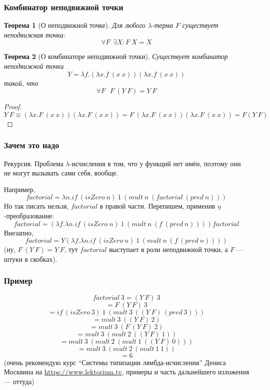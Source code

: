 \documentclass[xetex,mathserif,serif]{beamer}
\newtheorem{rustheorem}{Теорема}
\begin{document}
	\begin{frame}
		\frametitle{Комбинатор неподвижной точки}
		\begin{rustheorem}[О неподвижной точке]
			Для любого $\lambda$-терма $F$ существует неподвижная точка:
			$$\forall F\ \ \exists X : F\ X = X$$
			\vspace{-5mm}
		\end{rustheorem}
		\vspace{-5mm}
		\begin{rustheorem}[О комбинаторе неподвижной точки]
			Существует комбинатор неподвижной точки
			$$Y = \lambda f.(\lambda x.f\ (x\ x)) (\lambda x.f\ (x\ x))$$
			такой, что 
			$$\forall F\ \ \ F\ (Y\ F) = Y\ F$$
		\end{rustheorem}
		\vspace{-5mm}
		\begin{proof}
			\vspace{-7mm}
			$$Y\ F \equiv (\lambda x.F\ (x\ x))(\lambda x.F\ (x\ x)) 
				= F\ (\lambda x.F\ (x\ x))(\lambda x.F\ (x\ x)) = F(Y\ F)$$
			\vspace{-10mm}
		\end{proof}
	\end{frame}

	\begin{frame}
		\frametitle{Зачем это надо}
		Рекурсия. Проблема $\lambda$-исчисления в том, что у функций нет имён, поэтому они не могут 
		вызывать сами себя, вообще.
		
		Например,
		$$factorial = \lambda n. if\ (isZero\ n)\ 1\ (mult\ n\ (factorial\ (pred\ n)))$$
		Но так писать нельзя, $factorial$ в правой части. Перепишем, применив $\eta$-преобразование:
		$$factorial = (\lambda f.\lambda n.if\ (isZero\ n)\ 1\ (mult\ n\ (f\ (pred\ n)))) factorial$$
		Внезапно, 
		$$factorial = Y (\lambda f.\lambda n.if\ (isZero\ n)\ 1\ (mult\ n\ (f\ (pred\ n))))$$
		(ну, $F\ (Y\ F) = Y\ F$, тут $factorial$ выступает в роли неподвижной точки, а $F$ --- 
		штуки в скобках).
	\end{frame}

	\begin{frame}
		\frametitle{Пример}
		$$factorial\ 3 = (Y\ F)\ 3$$
		$$= F\ (Y\ F)\ 3$$
		$$= if\ (isZero\ 3)\ 1\ (mult\ 3\ ((Y\ F)\ (pred\ 3)))$$
		$$= mult\ 3\ ((Y\ F)\ 2)$$
		$$= mult\ 3\ (F\ (Y\ F)\ 2)$$
		$$= mult\ 3\ (mult\ 2\ ((Y\ F)\ 1))$$
		$$= mult\ 3\ (mult\ 2\ (mult\ 1\ ((Y\ F)\ 0)))$$
		$$= mult\ 3\ (mult\ 2\ (mult\ 1\ 1))$$
		$$= 6$$
		(очень рекомендую курс ``Системы типизации лямбда-исчисления'' Дениса Москвина на \url{https://www.lektorium.tv}, примеры и часть дальнейшего изложения --- оттуда)
	\end{frame}
\end{document}
